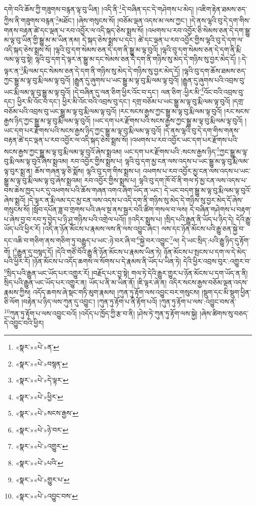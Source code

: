 དགེ་བའི་ཆོས་ཀྱི་གཟུགས་བརྙན་ལྟ་བུ་ཡིན། །འདི་ནི་\footnote{«སྣར་»«པེ་»ན་}དེ་བཞིན་དང་དེ་གཤེགས་པ་མེད། །འཇིག་རྟེན་ཐམས་ཅད་ཀྱིས་ནི་གཟུགས་བརྙན་\footnote{«སྣར་»«པེ་»བསྙན་}མཐོང་། །ཞེས་གསུངས་སོ། །བཅོམ་ལྡན་འདས་མ་ལས་ཀྱང་། །དེ་ནས་ལྷའི་བུ་དེ་དག་གིས་གནས་བརྟན་ཚེ་དང་ལྡན་པ་རབ་འབྱོར་ལ་འདི་སྐད་ཅེས་སྨྲས་སོ། །འཕགས་པ་རབ་འབྱོར་ཅི་སེམས་ཅན་དེ་དག་སྒྱུ་མ་ལྟ་བུ་ཡིན་གྱི་སྒྱུ་མ་མ་ཡིན་ནམ། དེ་སྐད་ཅེས་སྨྲས་པ་དང་། ཚེ་དང་ལྡན་པ་རབ་འབྱོར་གྱིས་ལྷའི་བུ་དེ་དག་ལ་འདི་སྐད་ཅེས་སྨྲས་སོ། །ལྷའི་བུ་དག་སེམས་ཅན་དེ་དག་ནི་སྒྱུ་མ་ལྟ་བུའོ། །ལྷའི་བུ་དག་སེམས་ཅན་དེ་དག་ནི་རྨི་ལམ་ལྟ་བུ་སྟེ། ལྷའི་བུ་དག་དེ་ལྟར་ན་སྒྱུ་མ་དང་སེམས་ཅན་དེ་དག་ནི་གཉིས་སུ་མེད་དེ་གཉིས་སུ་བྱར་མེད་དོ། །:དེ་ལྟར་ན་\footnote{«སྣར་»«པེ་»དེ་ལྟར་}རྨི་ལམ་དང་སེམས་ཅན་དེ་དག་ནི་གཉིས་སུ་མེད་དེ་གཉིས་སུ་བྱར་མེད་དོ། །ལྷའི་བུ་དག་ཆོས་ཐམས་ཅད་ཀྱང་སྒྱུ་མ་ལྟ་བུ་རྨི་ལམ་ལྟ་བུའོ། །རྒྱུན་དུ་ཞུགས་པ་ཡང་སྒྱུ་མ་ལྟ་བུ་རྨི་ལམ་ལྟ་བུའོ། །རྒྱུན་དུ་ཞུགས་པའི་འབྲས་བུ་ཡང་རྨི་ལམ་ལྟ་བུ་སྒྱུ་མ་ལྟ་བུའོ། །དེ་བཞིན་དུ་ལན་ཅིག་ཕྱིར་འོང་བ་དང་། ལན་ཅིག་:ཕྱིར་མི་\footnote{«སྣར་»«པེ་»ཕྱིར་}འོང་བའི་འབྲས་བུ་དང་། ཕྱིར་མི་འོང་བ་དང་། ཕྱིར་མི་འོང་བའི་འབྲས་བུ་དང་། དགྲ་བཅོམ་པ་ཡང་སྒྱུ་མ་ལྟ་བུ་རྨི་ལམ་ལྟ་བུའོ། །དགྲ་བཅོམ་པའི་འབྲས་བུ་ཡང་སྒྱུ་མ་ལྟ་བུ་རྨི་ལམ་ལྟ་བུའོ། །རང་སངས་རྒྱས་ཀྱང་སྒྱུ་མ་ལྟ་བུ་རྨི་ལམ་ལྟ་བུའོ། །རང་སངས་རྒྱས་ཉིད་ཀྱང་སྒྱུ་མ་ལྟ་བུ་རྨི་ལམ་ལྟ་བུའོ། །ཡང་དག་པར་རྫོགས་པའི་སངས་རྒྱས་ཀྱང་སྒྱུ་མ་ལྟ་བུ་རྨི་ལམ་ལྟ་བུའོ། །ཡང་དག་པར་རྫོགས་པའི་སངས་རྒྱས་ཉིད་ཀྱང་སྒྱུ་མ་ལྟ་བུ་རྨི་ལམ་ལྟ་བུའོ། །དེ་ནས་ལྷའི་བུ་དེ་དག་གིས་གནས་བརྟན་ཚེ་དང་ལྡན་པ་རབ་འབྱོར་ལ་འདི་སྐད་ཅེས་སྨྲས་སོ། །འཕགས་པ་རབ་འབྱོར་ཡང་དག་པར་རྫོགས་པའི་སངས་རྒྱས་ཀྱང་སྒྱུ་མ་ལྟ་བུ་རྨི་ལམ་ལྟ་བུའོ་ཞེས་སྨྲའམ། ཡང་དག་པར་རྫོགས་པའི་:སངས་རྒྱས་ཉིད་\footnote{«སྣར་»«པེ་»སངས་རྒྱས་}ཀྱང་སྒྱུ་མ་ལྟ་བུ་རྨི་ལམ་ལྟ་བུའོ་ཞེས་སྨྲའམ། རབ་འབྱོར་གྱིས་སྨྲས་པ། ལྷའི་བུ་དག་མྱ་ངན་ལས་འདས་པ་ཡང་སྒྱུ་མ་ལྟ་བུ་རྨི་ལམ་ལྟ་བུར་སྨྲ་ན། ཆོས་གཞན་ལྟ་ཅི་སྨོས། ལྷའི་བུ་དག་གིས་སྨྲས་པ། འཕགས་པ་རབ་འབྱོར་མྱ་ངན་ལས་འདས་པ་ཡང་སྒྱུ་མ་ལྟ་བུ་རྨི་ལམ་ལྟ་བུ་ཞེས་སྨྲའམ། རབ་འབྱོར་གྱིས་སྨྲས་པ། ལྷའི་བུ་དག་ཁོ་བོ་ནི་གལ་ཏེ་མྱ་ངན་ལས་འདས་པ་བས་ཆེས་ཁྱད་པར་དུ་འཕགས་པའི་ཆོས་གཞན་འགའ་ཞིག་ཡོད་ན་ཡང་། དེ་ཡང་བདག་སྒྱུ་མ་ལྟ་བུ་རྨི་ལམ་ལྟ་བུའོ་ཞེས་སྨྲའོ། །དེ་ལྟར་ན་རྨི་ལམ་དང་མྱ་ངན་ལས་འདས་པ་འདི་དག་ནི་གཉིས་སུ་མེད་དེ་གཉིས་སུ་བྱར་མེད་དོ་ཞེས་གསུངས་སོ། །སློབ་དཔོན་ཟླ་བ་གྲགས་པའི་ཞལ་སྔ་ནས་སྦྱར་བའི་ཚིག་གསལ་བ་ལས། དེ་བཞིན་གཤེགས་པ་བརྟག་པ་ཞེས་བྱ་བ་རབ་ཏུ་བྱེད་པ་ཉི་ཤུ་གཉིས་པའི་འགྲེལ་པའོ།། །།འདིར་སྨྲས་པ། །སྲིད་པའི་རྒྱུན་ནི་ཡོད་པ་ཉིད་དེ། དེའི་རྒྱུ་ཡོད་པའི་ཕྱིར་རོ། །འདི་ན་ཉོན་མོངས་པ་རྣམས་ལས་ནི་ལས་འབྱུང་ཞིང་། ལས་དང་ཉོན་མོངས་པའི་རྒྱུ་ཅན་སྐྱེ་བ་དང་འཆི་བ་གཅིག་ནས་གཅིག་ཏུ་བརྒྱུད་པ་ཡང་:ཉེ་བར་ཞི་བ་\footnote{«སྣར་»«པེ་»ཉེ་བར་}སྐྱེ་བར་འབྱུང་\footnote{«སྣར་»«པེ་»འགྱུར་}ལ། དེ་ཡང་སྲིད་:པའི་རྒྱུ་ཉིད་དུ་རྟོག་གོ། །\footnote{«སྣར་»«པེ་»པའི་}རྒྱུན་དུ་བསྙད་དོ། །དེའི་གཙོ་བོའི་རྒྱུ་ནི་ཉོན་མོངས་པ་རྣམས་ཡིན་ཏེ། ཉོན་མོངས་པ་སྤངས་པ་དག་ལ་དེ་མེད་པའི་ཕྱིར་རོ། །ཉོན་མོངས་པ་འདོད་ཆགས་ལ་སོགས་པ་དེ་རྣམས་ནི་ཡོད་པ་ཡིན་ཏེ། དེའི་ཕྱིར་འབྲས་བུར་:འགྱུར་བ་\footnote{«སྣར་»«པེ་»གྱུར་པ་}སྲིད་པའི་རྒྱུན་ཡང་ཡོད་པར་འགྱུར་རོ། །བརྗོད་པར་བྱ་སྟེ། གལ་ཏེ་དེའི་རྒྱུར་གྱུར་པ་ཉོན་མོངས་པ་དག་ཡོད་ན་ནི། སྲིད་པའི་རྒྱུན་ཡང་ཡོད་པར་འགྱུར་ན། ཡོད་པ་ནི་མ་ཡིན་ནོ། །ཇི་ལྟར་ཞེ་ན། འདིར་སངས་རྒྱས་བཅོམ་ལྡན་འདས་རྣམས་ཀྱིས། འདོད་ཆགས་ཞེ་སྡང་གཏི་མུག་རྣམས། །ཀུན་ཏུ་རྟོག་ལས་འབྱུང་བར་གསུངས། །སྡུག་དང་མི་སྡུག་ཕྱིན་ཅི་ལོག །བརྟེན་པ་ཉིད་ལས་ཀུན་དུ་འབྱུང་། །ཀུན་ཏུ་རྟོག་པ་ནི་རྟོག་པའོ། །ཀུན་ཏུ་རྟོག་པ་ལས་:འབྱུང་བས་ན་\footnote{«སྣར་»«པེ་»འབྱུང་བས་}ཀུན་ཏུ་རྟོག་པ་ལས་འབྱུང་བའོ། །འདོད་པ་ཁྱོད་ཀྱི་རྩ་བ་ནི། །ཤེས་ཏེ་ཀུན་ཏུ་རྟོག་ལས་སྐྱེ། །ཞེས་ཚིགས་སུ་བཅད་དེ་འབྱུང་བའི་ཕྱིར། 
